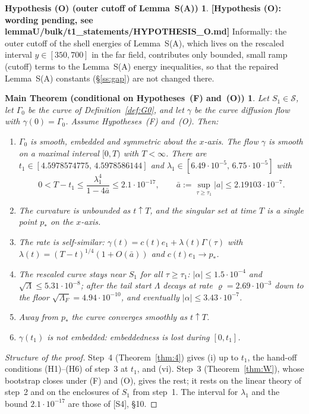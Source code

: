 \documentclass[11pt]{amsart}
\newtheorem*{maintheorem}{Main Theorem (conditional on Hypotheses~(F) and~(O))}
\theoremstyle{definition}
\newtheorem*{hypO}{Hypothesis (O) (outer cutoff of Lemma~S(A))}
\theoremstyle{remark}
\newcommand{\Lam}{\Lambda}
\newcommand{\dref}[1]{[\textsf{#1}]}
\newcommand{\Sset}{\mathcal S}
\begin{document}
\begin{hypO}
\textbf{[Hypothesis (O): wording pending, see lemmaU/bulk/t1_statements/HYPOTHESIS_O.md]} Informally: the outer cutoff of the shell energies of Lemma~S\textup{(A)}, which lives on the rescaled interval $y\in[350,700]$ in the far field, contributes only bounded, small ramp (cutoff) terms to the Lemma~S\textup{(A)} energy inequalities, so that the repaired Lemma~S\textup{(A)} constants (\S\ref{ss:gap}) are not changed there.
\end{hypO}

\begin{maintheorem}
Let $S_1\in\Sset$, let $\Gamma_0$ be the curve of Definition~\ref{def:G0}, and let $\gamma$ be the curve diffusion flow with $\gamma(0)=\Gamma_0$. Assume Hypotheses~\textup{(F)} and~\textup{(O)}. Then:
\begin{enumerate}[label=\textup{(\roman*)},leftmargin=*,itemsep=1pt]
\item $\Gamma_0$ is smooth, embedded and symmetric about the $x$-axis. The flow $\gamma$ is smooth on a maximal interval $[0,T)$ with $T<\infty$. There are $t_1\in[4.5978574775,\,4.5978586144]$ and $\lambda_1\in[6.49\cdot10^{-5},\,6.75\cdot10^{-5}]$ with
\[
0<T-t_1\le\frac{\lambda_1^4}{1-4\bar a}\le2.1\cdot10^{-17},\qquad\bar a:=\sup_{\tau\ge\tau_1}|a|\le2.19103\cdot10^{-7}.
\]
\item The curvature is unbounded as $t\uparrow T$, and the singular set at time $T$ is a single point $p_*$ on the $x$-axis.
\item The rate is self-similar: $\gamma(t)=c(t)e_1+\lambda(t)\Gamma(\tau)$ with $\lambda(t)=(T-t)^{1/4}(1+O(\bar a))$ and $c(t)e_1\to p_*$.
\item The rescaled curve stays near $S_1$ for all $\tau\ge\tau_1$: $|\alpha|\le1.5\cdot10^{-4}$ and $\sqrt\Lam\le5.31\cdot10^{-8}$; after the tail start $\Lam$ decays at rate $\varrho=2.69\cdot10^{-3}$ down to the floor $\sqrt{\Lam_F}=4.94\cdot10^{-10}$, and eventually $|\alpha|\le3.43\cdot10^{-7}$.
\item Away from $p_*$ the curve converges smoothly as $t\uparrow T$.
\item $\gamma(t_1)$ is not embedded: embeddedness is lost during $[0,t_1]$.
\end{enumerate}
\end{maintheorem}

\begin{proof}[Structure of the proof]
Step~4 (Theorem~\ref{thm:4}) gives (i) up to $t_1$, the hand-off conditions (H1)--(H6) of step~3 at $t_1$, and (vi). Step~3 (Theorem~\ref{thm:W}), whose bootstrap closes under (F) and (O), gives the rest; it rests on the linear theory of step~2 and on the enclosures of $S_1$ from step~1. The interval for $\lambda_1$ and the bound $2.1\cdot10^{-17}$ are those of \dref{S4}, \S10.
\end{proof}
\end{document}

